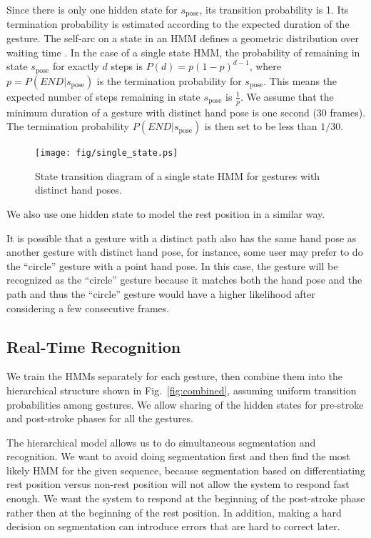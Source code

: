 Since there is only one hidden state for $s_{\text{pose}}$, its transition
probability is 1. Its termination probability is estimated according to the
expected duration of the gesture. The self-arc on a state in an HMM defines a 
geometric distribution over waiting time \cite{murphy02}. In the case of a
single state HMM, the probability of remaining in state $s_{\text{pose}}$ for
exactly $d$ steps is $P(d) = p(1-p)^{d - 1}$, where $p = P(END|s_\text{pose})$
is the termination probability for $s_{\text{pose}}$. This means the expected
number of steps remaining in state $s_{\text{pose}}$ is $\frac{1}{p}$. We assume
that the minimum duration of a gesture with distinct hand pose is one second
(30 frames). The termination probability $P(END|s_\text{pose})$ is then set to
be less than $1/30$.

\begin{figure}[t]
\centering
\texttt{[image: fig/single\_state.ps]}
\caption{State transition diagram of a single state HMM for gestures with
distinct hand poses. }
\label{fig:single}
\end{figure}

We also use one hidden state to model the rest position in a similar way.

It is possible that a gesture with a distinct path also has the same hand pose
as another gesture with distinct hand pose, for instance, some user may prefer
to do the ``circle'' gesture with a point hand pose. In this case, the gesture
will be recognized as the ``circle'' gesture because it matches both the hand
pose and the path and thus the ``circle'' gesture would have a higher likelihood
after considering a few consecutive frames.

\subsection{Real-Time Recognition}
We train the HMMs separately for each gesture, then combine them into the
hierarchical structure shown in Fig.~\ref{fig:combined}, assuming uniform
transition probabilities among gestures.
We allow sharing of the hidden states for pre-stroke and post-stroke phases for all the gestures. 

The hierarchical model allows us to do simultaneous segmentation and
recognition. We want to avoid doing segmentation first and then find the most
likely HMM for the given sequence, because segmentation based on
differentiating rest position versus non-rest position will not allow the system
to respond fast enough. We want the system to respond at the beginning of the
post-stroke phase rather then at the beginning of the rest position. In
addition, making a hard decision on segmentation can introduce errors that
are hard to correct later. 

